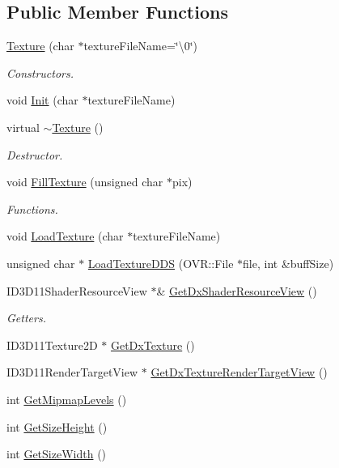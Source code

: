 \subsection*{Public Member Functions}
\begin{DoxyCompactItemize}
\item 
\hyperlink{class_texture_af2a4c84d1c98677ce680586bc0fb4bb3}{Texture} (char $\ast$texture\+File\+Name=\char`\"{}\textbackslash{}0\char`\"{})
\begin{DoxyCompactList}\small\item\em Constructors. \end{DoxyCompactList}\item 
void \hyperlink{class_texture_ae4c6a5ee970eb169801555a2a0ca304c}{Init} (char $\ast$texture\+File\+Name)
\item 
virtual \hyperlink{class_texture_a09c4bcb7462f64c1d20fa69dba3cee8a}{$\sim$\+Texture} ()
\begin{DoxyCompactList}\small\item\em Destructor. \end{DoxyCompactList}\item 
void \hyperlink{class_texture_ae89d96eb1e3d905d37e64694628ec75a}{Fill\+Texture} (unsigned char $\ast$pix)
\begin{DoxyCompactList}\small\item\em Functions. \end{DoxyCompactList}\item 
void \hyperlink{class_texture_a7197223117d32c918ddfcd59d803a92e}{Load\+Texture} (char $\ast$texture\+File\+Name)
\item 
unsigned char $\ast$ \hyperlink{class_texture_a000d60714e60b703dd3f189e515c89a5}{Load\+Texture\+D\+DS} (O\+V\+R\+::\+File $\ast$file, int \&buff\+Size)
\item 
I\+D3\+D11\+Shader\+Resource\+View $\ast$\& \hyperlink{class_texture_a15710fdbf218bc437795d82b7d43d895}{Get\+Dx\+Shader\+Resource\+View} ()
\begin{DoxyCompactList}\small\item\em Getters. \end{DoxyCompactList}\item 
I\+D3\+D11\+Texture2D $\ast$ \hyperlink{class_texture_a2f7fb3841e9dcbbf8caf9ef3517b8c02}{Get\+Dx\+Texture} ()
\item 
I\+D3\+D11\+Render\+Target\+View $\ast$ \hyperlink{class_texture_ae9ff50740ff4ab8f9d4c19fd147d3bd2}{Get\+Dx\+Texture\+Render\+Target\+View} ()
\item 
int \hyperlink{class_texture_acc9f29e15f13b697f91779e2f87597b5}{Get\+Mipmap\+Levels} ()
\item 
int \hyperlink{class_texture_aa77eaaed00df44c7d9786d9a84e6a8c2}{Get\+Size\+Height} ()
\item 
int \hyperlink{class_texture_a1549f86a0410d3ea207fd991224eb45c}{Get\+Size\+Width} ()
\end{DoxyCompactItemize}
